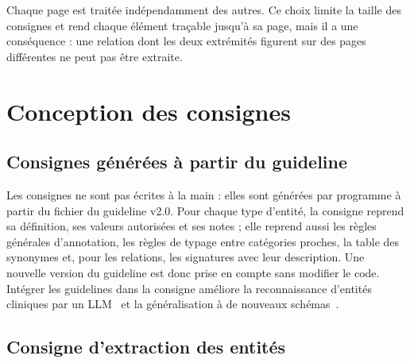Chaque page est traitée indépendamment des autres. Ce choix limite la taille des consignes et rend chaque élément traçable jusqu'à sa page, mais il a une conséquence : une relation dont les deux extrémités figurent sur des pages différentes ne peut pas être extraite.

\section{Conception des consignes}\label{sec:c4-prompt}

\subsection{Consignes générées à partir du guideline}

Les consignes ne sont pas écrites à la main : elles sont générées par programme à partir du fichier du guideline v2.0. Pour chaque type d'entité, la consigne reprend sa définition, ses valeurs autorisées et ses notes ; elle reprend aussi les règles générales d'annotation, les règles de typage entre catégories proches, la table des synonymes et, pour les relations, les signatures avec leur description. Une nouvelle version du guideline est donc prise en compte sans modifier le code. Intégrer les guidelines dans la consigne améliore la reconnaissance d'entités cliniques par un LLM~\cite{hu2024clinicalner} et la généralisation à de nouveaux schémas~\cite{sainz2024gollie}.

\subsection{Consigne d'extraction des entités}\label{sec:c4-contraintes-entites}

